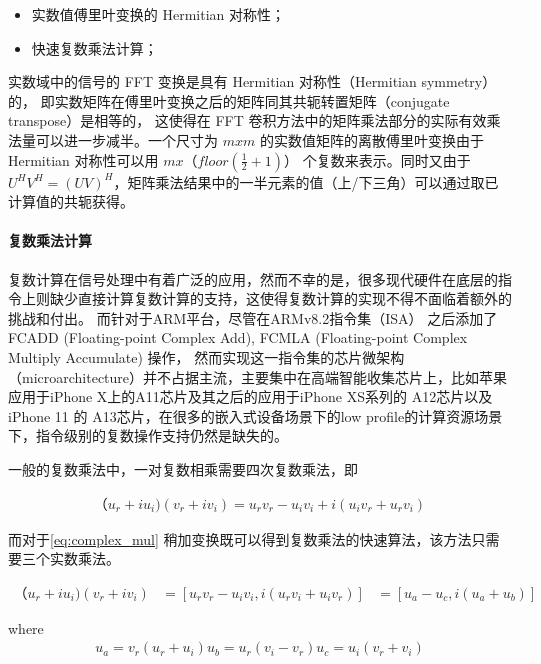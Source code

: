 \begin{itemize}
  \item 实数值傅里叶变换的 Hermitian 对称性；
  \item 快速复数乘法计算；
\end{itemize}

实数域中的信号的 FFT 变换是具有 Hermitian 对称性（Hermitian symmetry）的， 即实数矩阵在傅里叶变换之后的矩阵同其共轭转置矩阵（conjugate transpose）是相等的，
这使得在 FFT 卷积方法中的矩阵乘法部分的实际有效乘法量可以进一步减半。一个尺寸为 $m x m$ 的实数值矩阵的离散傅里叶变换由于 Hermitian 对称性可以用 $ m x （floor(\frac{1}{2} + 1)） $ 
个复数来表示。同时又由于 $ U^H V^H = ( UV )^H $，矩阵乘法结果中的一半元素的值（上/下三角）可以通过取已计算值的共轭获得。

\paragraph{复数乘法计算}
复数计算在信号处理中有着广泛的应用，然而不幸的是，很多现代硬件在底层的指令上则缺少直接计算复数计算的支持，这使得复数计算的实现不得不面临着额外的挑战和付出。
而针对于ARM平台，尽管在ARMv8.2指令集（ISA） 之后添加了 FCADD (Floating-point Complex Add), FCMLA (Floating-point Complex Multiply Accumulate) 操作，
然而实现这一指令集的芯片微架构（microarchitecture）并不占据主流，主要集中在高端智能收集芯片上，比如苹果应用于iPhone X上的A11芯片及其之后的应用于iPhone XS系列的
A12芯片以及iPhone 11 的 A13芯片，在很多的嵌入式设备场景下的low profile的计算资源场景下，指令级别的复数操作支持仍然是缺失的。

一般的复数乘法中，一对复数相乘需要四次复数乘法，即

\begin{align}
\label{eq:complex_mul}
  （u_r + i u_i) (v_r + i v_i) = u_r v_r - u_i v_i + i ( u_i v_r + u_r v_i )
\end{align}

而对于\ref{eq:complex_mul} 稍加变换既可以得到复数乘法的快速算法，该方法只需要三个实数乘法。

\begin{align}
\label{eq:complex_mul_fast}
  （u_r + i u_i) (v_r + i v_i) &= [ u_r v_r - u_i v_i, i(u_r v_i + u_i v_r)]
                               &= [ u_a - u_c,i( u_a + u_b) ]
\end{align}

where 
\begin{align}
u_a = v_r ( u_r + u_i )
u_b = u_r ( v_i - v_r )
u_c = u_i ( v_r + v_i )
\end{align}

